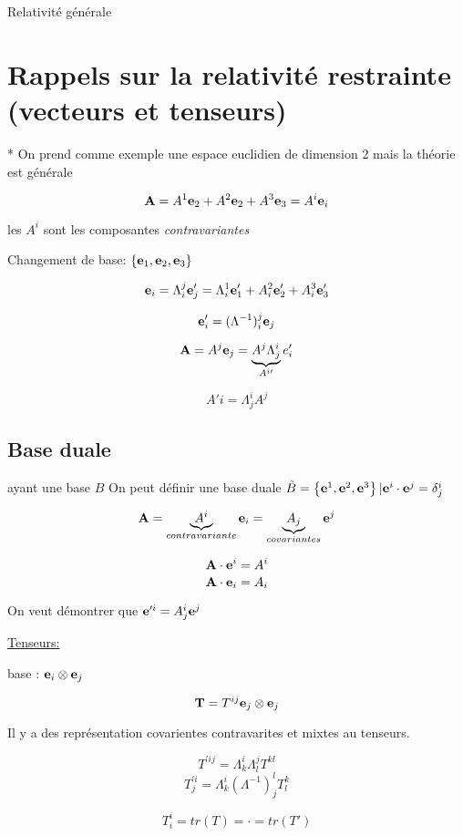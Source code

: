 


{\Huge Relativité générale}

\section*{Rappels sur la relativité restrainte (vecteurs et tenseurs)}

* On prend comme exemple une espace euclidien de dimension 2 mais la théorie est générale


$$\vb{A} = A^{1}\vb{e}_2 + A^{2}\vb{e}_2 + A^3\vb{e}_3 = A^{i}\vb{e}_i$$ 

les $A^{i}$ sont les composantes \textit{contravariantes } 


Changement de base: $\left\{ \vb{e}_1, \vb{e}_2, \vb{e}_3 \right\} $  

$$\vb{e}_i = \Lambda_{i}^{j} \vb{e}_j' = \Lambda_i^{1}\vb{e}_1' + A_i^{2}\vb{e}_2' +A_i^{3}\vb{e}_3' $$ 

$$\vb{e}_i' = (\Lambda^{-1})_i^{j}\vb{e}_j$$ 

$$\vb{A} = A^j\vb{e}_j = \underbrace{A^{j}\Lambda_j^{i}}_{A^{i\prime}}e_i' $$ 

$$\boxed{A'i = \Lambda_j^{i}A^{j}}$$ 

\subsection*{Base duale}


ayant une base $B$ On peut définir une base duale $\tilde B = \left\{ \vb{e}^1, \vb{e}^2, \vb{e}^3 \right\} | \vb{e}^i \cdot \vb{e}^j = \delta^i_j  $  

$$\vb{A} = \underbrace{A^{i}}_{contravariante} \vb{e}_i = \underbrace{A_j}_{covariantes}  \vb{e}^j$$ 


$$\vb{A} \cdot \vb{e}^i = A^i$$ 
$$\vb{A} \cdot \vb{e}_i = A_i $$ 


On veut démontrer que $\vb{e}^{\prime i} = A_{j}^{i} \vb{e}^j $ 


\underline{Tenseurs:} 


base : $\vb{e}_i \otimes \vb{e}_j$

$$\vb{T}= T^{ij}\vb{e}_j \otimes \vb{e}_j$$

Il y a des représentation covarientes contravarites et mixtes au tenseurs.


$$T^{\prime ij}  = \Lambda_k^{i}\Lambda_l^{j}T^{kl}$$ 
$$T_j^{\prime i} = \Lambda_k^{i} (\Lambda^{-1})_j^{l}T_l^k$$ 


$$T_i^{i} = tr(T) = \cdot =tr (T') $$ 


